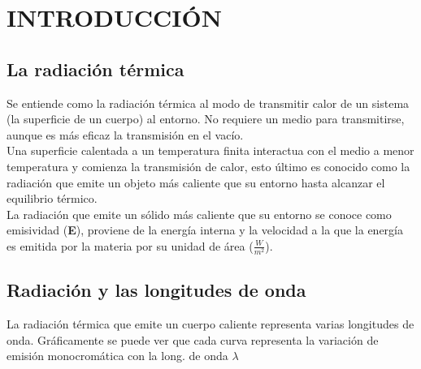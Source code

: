 \documentclass[a4paper]{article}
\begin{document}
\renewcommand{\normalsize}{\fontsize{12}{18}\selectfont}
\fancyhf{}
\renewcommand{\headrulewidth}{0pt}
\renewcommand{\footrulewidth}{0pt}
\setlength{\footskip}{0pt}

\newpage
\newpage

\thispagestyle{empty}
\setcounter{page}{0}
\tableofcontents

\newpage
\thispagestyle{fancy}


\twocolumn
\flushbottom
\section{INTRODUCCIÓN}
    \subsection{La radiación térmica}
        \indent Se entiende como la radiación térmica al modo de transmitir calor de un sistema (la superficie de un cuerpo) al entorno. No requiere un medio para transmitirse, aunque es más eficaz la transmisión en el vacío. \\
        \indent Una superficie calentada a un temperatura finita interactua con el medio a menor temperatura y comienza la transmisión de calor, esto último es conocido como la radiación que emite un objeto más caliente que su entorno hasta alcanzar el equilibrio térmico. \\
        \indent La radiación que emite un sólido más caliente que su entorno se conoce como emisividad (\textbf{E}), proviene de la energía interna y la velocidad a la que la energía es emitida por la materia por su unidad de área (\textit{$\frac {W} {m^2}$}). \\

    \subsection{Radiación y las longitudes de onda}
        \indent La radiación térmica que emite un cuerpo caliente representa varias longitudes de onda. Gráficamente se puede ver que cada curva representa la variación de emisión monocromática con la long. de onda $\lambda$ \\

    \vspace{4.8cm}
\end{document}
